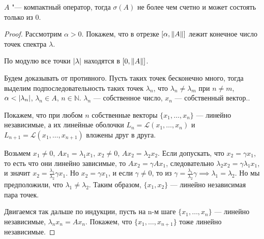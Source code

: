 \documentclass{article}
\begin{document}
\begin{theorem}
    $A$ "--- компактный оператор, тогда $\sigma(A)$ не
    более чем счетно и может состоять только из 0.
\end{theorem}
\begin{proof}
    Рассмотрим $\alpha > 0$. Покажем, что в отрезке $[\alpha,  \left\|A\right\|]$ лежит конечное число точек спектра $\lambda$.
    
    По модулю все точки $\left|\lambda\right|$ находятся в $[0, \left\|A\right\|]$.
    


    Будем доказывать от противного. Пусть таких точек бесконечно много, тогда выделим подпоследовательность таких точек $\lambda_{n}$, что $\lambda_{n} \neq \lambda_{m}$ при $n \neq m$, $\alpha < \left|\lambda_{n}\right|$, $\lambda_{n} \in A$, $n \in \mathbb{N}$. $\lambda_{n}$ --- собственное число, $x_{n}$ --- собственный вектор..
    
    Покажем, что при любом $n$ собственные векторы $\{x_{1}, \dotso, x_{n}\}$ --- линейно независимые, а их линейные оболочки $L_{n} = \mathcal{L}(x_{1}, \dotso, x_{n})$ и $L_{n+1} = \mathcal{L}(x_{1}, \dotso, x_{n+1})$ вложены друг в друга. 
    
    Возьмем $x_{1} \neq 0$, $Ax_{1} = \lambda_{1}x_{1}$, $x_{2} \neq 0$, $Ax_{2} = \lambda_{2}x_{2}$. 
    Если допускать, что $x_{2} = \gamma x_{1}$, то есть что они линейно зависимые, то $Ax_{2} = \gamma Ax_{1}$, следовательно $\lambda_{2}x_{2} = \gamma \lambda_{1}x_{1}$, и значит $x_{2} = \frac{\lambda_{1}}{\lambda_{2}} \gamma x_{1}$. Но $x_{2} = \gamma x_{1}$, и если $\gamma \neq 0$, то из $\gamma = \frac{\lambda_{1}}{\lambda_{2}} \gamma \implies \lambda_{1} = \lambda_{2}$. Но мы предположили, что $\lambda_{1} \neq \lambda_{2}$.
    Таким образом, $\{x_{1}, x_{2}\}$ --- линейно независимая пара точек.
    
    Двигаемся так дальше по индукции, пусть на n-м шаге $\{x_{1}, \dotso, x_{n}\}$ --- линейно независимые, $\lambda_{n}x_{n} = A x_{n}$. Покажем, что $\{x_{1}, \dotso, x_{n+1}\}$ тоже линейно независимые.
    

\end{proof}
\end{document}
